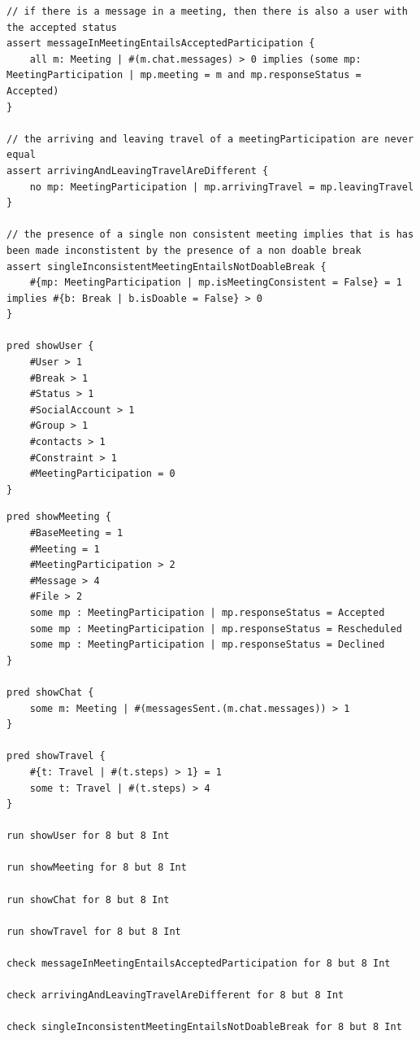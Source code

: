 \begin{lstlisting}[style=alloy]
// if there is a message in a meeting, then there is also a user with the accepted status
assert messageInMeetingEntailsAcceptedParticipation {
	all m: Meeting | #(m.chat.messages) > 0 implies (some mp: MeetingParticipation | mp.meeting = m and mp.responseStatus = Accepted)
}

// the arriving and leaving travel of a meetingParticipation are never equal
assert arrivingAndLeavingTravelAreDifferent {
	no mp: MeetingParticipation | mp.arrivingTravel = mp.leavingTravel
}

// the presence of a single non consistent meeting implies that is has been made inconstistent by the presence of a non doable break
assert singleInconsistentMeetingEntailsNotDoableBreak {
	#{mp: MeetingParticipation | mp.isMeetingConsistent = False} = 1 implies #{b: Break | b.isDoable = False} > 0
}

pred showUser {
	#User > 1
	#Break > 1
	#Status > 1
	#SocialAccount > 1
	#Group > 1
	#contacts > 1
	#Constraint > 1
	#MeetingParticipation = 0
}
\end{lstlisting}
\clearpage
\begin{lstlisting}[style=alloy]
pred showMeeting {
	#BaseMeeting = 1
	#Meeting = 1
	#MeetingParticipation > 2
	#Message > 4
	#File > 2
	some mp : MeetingParticipation | mp.responseStatus = Accepted
	some mp : MeetingParticipation | mp.responseStatus = Rescheduled
	some mp : MeetingParticipation | mp.responseStatus = Declined
}

pred showChat {
	some m: Meeting | #(messagesSent.(m.chat.messages)) > 1
}

pred showTravel {
	#{t: Travel | #(t.steps) > 1} = 1
	some t: Travel | #(t.steps) > 4
}

run showUser for 8 but 8 Int

run showMeeting for 8 but 8 Int

run showChat for 8 but 8 Int

run showTravel for 8 but 8 Int

check messageInMeetingEntailsAcceptedParticipation for 8 but 8 Int

check arrivingAndLeavingTravelAreDifferent for 8 but 8 Int

check singleInconsistentMeetingEntailsNotDoableBreak for 8 but 8 Int
\end{lstlisting}

